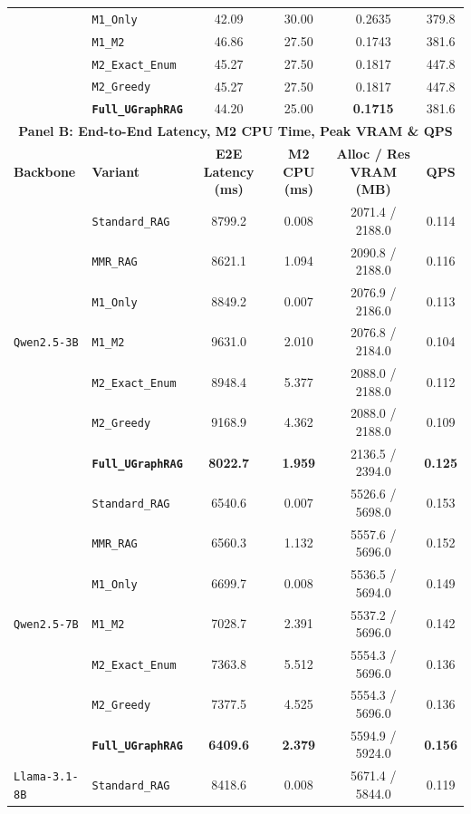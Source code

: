 \documentclass[11pt]{article}
\begin{document}
\begin{table}[t]
{{\begin{tabular}{llcccc}
& \texttt{M1\_Only} & 42.09 & 30.00 & 0.2635 & 379.8 \\
& \texttt{M1\_M2} & 46.86 & 27.50 & 0.1743 & 381.6 \\
& \texttt{M2\_Exact\_Enum} & 45.27 & 27.50 & 0.1817 & 447.8 \\
& \texttt{M2\_Greedy} & 45.27 & 27.50 & 0.1817 & 447.8 \\
& \textbf{\texttt{Full\_UGraphRAG}} & 44.20 & 25.00 & \textbf{0.1715} & 381.6 \\
\midrule
\midrule
\multicolumn{6}{c}{\textbf{Panel B: End-to-End Latency, M2 CPU Time, Peak VRAM \& QPS}} \\
\midrule
\textbf{Backbone} & \textbf{Variant} & \textbf{E2E Latency (ms)} & \textbf{M2 CPU (ms)} & \textbf{Alloc / Res VRAM (MB)} & \textbf{QPS} \\
\midrule
\multirow{7}{*}{\texttt{Qwen2.5-3B}}
& \texttt{Standard\_RAG} & 8799.2 & 0.008 & 2071.4 / 2188.0 & 0.114 \\
& \texttt{MMR\_RAG} & 8621.1 & 1.094 & 2090.8 / 2188.0 & 0.116 \\
& \texttt{M1\_Only} & 8849.2 & 0.007 & 2076.9 / 2186.0 & 0.113 \\
& \texttt{M1\_M2} & 9631.0 & 2.010 & 2076.8 / 2184.0 & 0.104 \\
& \texttt{M2\_Exact\_Enum} & 8948.4 & 5.377 & 2088.0 / 2188.0 & 0.112 \\
& \texttt{M2\_Greedy} & 9168.9 & 4.362 & 2088.0 / 2188.0 & 0.109 \\
& \textbf{\texttt{Full\_UGraphRAG}} & \textbf{8022.7} & \textbf{1.959} & 2136.5 / 2394.0 & \textbf{0.125} \\
\midrule
\multirow{7}{*}{\texttt{Qwen2.5-7B}}
& \texttt{Standard\_RAG} & 6540.6 & 0.007 & 5526.6 / 5698.0 & 0.153 \\
& \texttt{MMR\_RAG} & 6560.3 & 1.132 & 5557.6 / 5696.0 & 0.152 \\
& \texttt{M1\_Only} & 6699.7 & 0.008 & 5536.5 / 5694.0 & 0.149 \\
& \texttt{M1\_M2} & 7028.7 & 2.391 & 5537.2 / 5696.0 & 0.142 \\
& \texttt{M2\_Exact\_Enum} & 7363.8 & 5.512 & 5554.3 / 5696.0 & 0.136 \\
& \texttt{M2\_Greedy} & 7377.5 & 4.525 & 5554.3 / 5696.0 & 0.136 \\
& \textbf{\texttt{Full\_UGraphRAG}} & \textbf{6409.6} & \textbf{2.379} & 5594.9 / 5924.0 & \textbf{0.156} \\
\midrule
\multirow{7}{*}{\texttt{Llama-3.1-8B}}
& \texttt{Standard\_RAG} & 8418.6 & 0.008 & 5671.4 / 5844.0 & 0.119 \\

\end{tabular}}}
\end{table}
\end{document}
